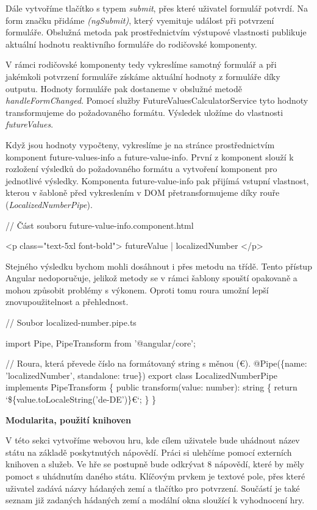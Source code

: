 Dále vytvoříme tlačítko s typem \emph{submit}, přes které uživatel formulář potvrdí. Na form značku přidáme \emph{(ngSubmit)}, který vyemituje událost při potvrzení formuláře. 
Obslužná metoda pak prostřednictvím výstupové vlastnosti publikuje aktuální hodnotu reaktivního formuláře do rodičovské komponenty.

V rámci rodičovské komponenty tedy vykreslíme samotný formulář a při jakémkoli potvrzení formuláře získáme aktuální hodnoty z formuláře díky outputu. 
Hodnoty formuláře pak dostaneme v obslužné metodě \emph{handleFormChanged}. Pomocí služby FutureValuesCalculatorService tyto hodnoty transformujeme do požadovaného formátu. 
Výsledek uložíme do vlastnosti \emph{futureValues}.

Když jsou hodnoty vypočteny, vykreslíme je na stránce prostřednictvím komponent future-values-info a future-value-info. 
První z komponent slouží k rozložení výsledků do požadovaného formátu a vytvoření komponent pro jednotlivé výsledky. 
Komponenta future-value-info pak přijímá vstupní vlastnost, kterou v šabloně před vykreslením v DOM přetransformujeme díky rouře (\emph{LocalizedNumberPipe}).

\begin{prog}
// Část souboru future-value-info.component.html

<p class="text-5xl font-bold">{{ futureValue | localizedNumber }}</p>
\end{prog}

Stejného výsledku bychom mohli dosáhnout i přes metodu na třídě. Tento přístup Angular nedoporučuje, jelikož metody se v rámci šablony spouští opakovaně a mohou způsobit problémy s výkonem. 
Oproti tomu roura umožní lepší znovupoužitelnost a přehlednost.

\begin{prog}
// Soubor localized-number.pipe.ts

import {Pipe, PipeTransform} from '@angular/core';

// Roura, která převede číslo na formátovaný string s měnou (€).
@Pipe(\{name: 'localizedNumber', standalone: true\})
export class LocalizedNumberPipe implements PipeTransform \{
  public transform(value: number): string \{
    return `\$\{value.toLocaleString('de-DE')\}€`;
  \}
\}
\end{prog}

\begin{flushleft}
  \textbf{Modularita, použití knihoven}
\end{flushleft}

V této sekci vytvoříme webovou hru, kde cílem uživatele bude uhádnout název státu na základě poskytnutých nápovědí. Práci si ulehčíme pomocí externích knihoven a služeb.
Ve hře se postupně bude odkrývat 8 nápovědí, které by měly pomoct s uhádnutím daného státu. 
Klíčovým prvkem je textové pole, přes které uživatel zadává názvy hádaných zemí a tlačítko pro potvrzení. 
Součástí je také seznam již zadaných hádaných zemí a modální okna sloužící k vyhodnocení hry.

